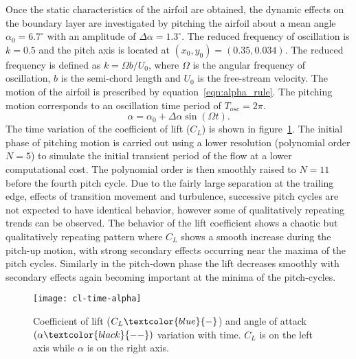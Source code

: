 Once the static characteristics of the airfoil are obtained, the dynamic effects on the boundary layer are investigated by pitching the airfoil about a mean angle $\alpha_{0}=6.7^{\circ}$ with an amplitude of $\Delta\alpha=1.3^{\circ}$. The reduced frequency of oscillation is $k=0.5$ and the pitch axis is located at $(x_{0},y_{0})=(0.35,0.034)$. The reduced frequency is defined as $k=\Omega b/U_{0}$, where $\Omega$ is the angular frequency of oscillation, $b$ is the semi-chord length and $U_{0}$ is the free-stream velocity. The motion of the airfoil is prescribed by equation~\ref{eqn:alpha_rule}. The pitching motion corresponds to an oscillation time period of $T_{osc}=2\pi$.
\begin{equation}
	\alpha = \alpha_{0} + \Delta\alpha\sin(\Omega t).
	\label{eqn:alpha_rule}
\end{equation}
The time variation of the coefficient of lift ($C_{L}$) is shown in figure~\ref{fig:cl-time-alpha}. The initial phase of pitching motion is carried out using a lower resolution (polynomial order $N=5$) to simulate the initial transient period of the flow at a lower computational cost. The polynomial order is then smoothly raised to $N=11$ before the fourth pitch cycle. Due to the fairly large separation at the trailing edge, effects of transition movement and turbulence, successive pitch cycles are not expected to have identical behavior, however some of qualitatively repeating trends can be observed. The behavior of the lift coefficient shows a chaotic but qualitatively repeating pattern where $C_{L}$ shows a smooth increase during the pitch-up motion, with strong secondary effects occurring near the maxima of the pitch cycles. Similarly in the pitch-down phase the lift decreases smoothly with secondary effects again becoming important at the minima of the pitch-cycles.
\begin{figure}[h]
		\centering
		\texttt{[image: cl-time-alpha]}
		\caption{Coefficient of lift ($C_{L} \textcolor{blue}{-}$) and angle of attack $(\alpha \textcolor{black}{--})$ variation with time. $C_{L}$ is on the left axis while $\alpha$ is on the right axis.}
		\label{fig:cl-time-alpha}
\end{figure}

